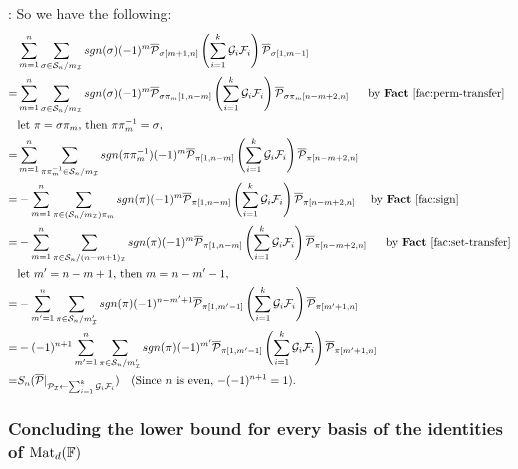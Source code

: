 \documentclass[12pt,reqno]{article}
\newcommand\F{\ensuremath{\mathbb F}}
\newcommand{\matd}{{\ensuremath{{\rm Mat}_d(\F)}}}
\newenvironment{proof}{\QuadSpace\par\noindent{\bf Proof}:}{\EndProof\HalfSpace}
\newcommand{\QuadSpace}{\vspace{0.25\baselineskip}}
\newcommand{\HalfSpace}{\vspace{0.5\baselineskip}}
\newcommand{\EndProof}{ \hfill \vrule width 1ex height 1ex depth 0pt }
\renewcommand{\t}[1]{\overline{#1}}
\newcommand{\s}{\sigma}
\renewcommand{\S}{\mathcal{S}}
\newcommand\ii{{\cal I}}
\begin{document}
\begin{proof}
So we have the following:
\begin{align*}
& \sum_{m=1}^{n} \sum_{\s\in \S_n/m_\ii}sgn(\s)(-1)^m \t{\mathcal P}_{\s[m+1,n]}\left(\sum_{i=1}^k\mathcal {G}_i \mathcal {F}_i\right) \t{\mathcal P}_{\s[1,m-1]}\\
=& \sum_{m=1}^{n} \sum_{\s\in \S_n/m_\ii}sgn(\s)(-1)^m \t{\mathcal P}_{\s\pi_m[1,n-m]}\left(\sum_{i=1}^k\mathcal {G}_i \mathcal {F}_i\right) \t{\mathcal P}_{\s\pi_m[n-m+2,n]} ~~~~~\text{by \textbf{Fact} \ref{fac:perm-transfer}}\\
&\text{let $\pi=\s\pi_m$, then $\pi\pi_m^{-1}=\s$,}\\
=& \sum_{m=1}^{n} \sum_{\pi\pi_m^{-1}\in \S_n/m_\ii}sgn(\pi\pi_m^{-1})(-1)^m \t{\mathcal P}_{\pi[1,n-m]}\left(\sum_{i=1}^k\mathcal {G}_i \mathcal {F}_i\right) \t{\mathcal P}_{\pi[n-m+2,n]}\\
=&-\sum_{m=1}^{n} \sum_{\pi\in (\S_n/m_\ii)\pi_m}sgn(\pi)(-1)^m \t{\mathcal P}_{\pi[1,n-m]}\left(\sum_{i=1}^k\mathcal {G}_i \mathcal {F}_i\right) \t{\mathcal P}_{\pi[n-m+2,n]} ~~~~\text{by \textbf{Fact} \ref{fac:sign}}\\
=&-\sum_{m=1}^{n} \sum_{\pi\in \S_{n}/(n-m+1)_\ii}sgn(\pi)(-1)^m \t{\mathcal P}_{\pi[1,n-m]}\left(\sum_{i=1}^k\mathcal {G}_i \mathcal {F}_i\right) \t{\mathcal P}_{\pi[n-m+2,n]} ~~~~~\text{by \textbf{Fact} \ref{fac:set-transfer}}\\
&\text{let $m'=n-m+1$, then $m=n-m'-1$,}\\
=& - \sum_{m'=1}^{n} \sum_{\pi\in \S_n/m_\ii'}sgn(\pi)(-1)^{n-m'+1} \t{\mathcal P}_{\pi[1,m'-1]}\left(\sum_{i=1}^k\mathcal {G}_i \mathcal {F}_i\right) \t{\mathcal P}_{\pi[m'+1,n]} \\
=& -(-1)^{n+1}\sum_{m'=1}^{n} \sum_{\pi\in \S_n/m_\ii'}sgn(\pi)(-1)^{m'} \t{\mathcal P}_{\pi[1,m'-1]}\left(\sum_{i=1}^k\mathcal {G}_i \mathcal {F}_i\right) \t{\mathcal P}_{\pi[m'+1,n]} \\
=&  S_{n}(\t{\mathcal P}|_{ \mathcal P _\ii\leftarrow \sum_{i=1}^k\mathcal {G}_i \mathcal {F}_i})~~~ (\text{Since $n$ is even, $-(-1)^{n+1}=1$}).
\end{align*}
\end{proof}



\subsubsection{Concluding the lower bound for every basis of the identities of \matd}
\label{sec:conc-for-any-basis-of-matd}
\end{document}
